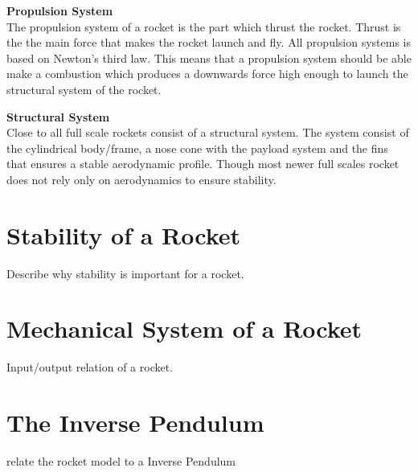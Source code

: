 \textbf{Propulsion System}\\
The propulsion system of a rocket is the part which thrust the rocket. Thrust is the the main force that makes the rocket launch and fly. All propulsion systems is based on Newton's third law. This means that a propulsion system should be able make a combustion which produces a downwards force high enough to launch the structural system of the rocket. 


\textbf{Structural System}\\
Close to all full scale rockets consist of a structural system. The system consist of the cylindrical body/frame, a nose cone with the payload system and the fins that ensures a stable aerodynamic profile. Though most newer full scales rocket does not rely only on aerodynamics to ensure stability.
   



\section{Stability of a Rocket}
Describe why stability is important for a rocket. 
\section{Mechanical System of a Rocket}
Input/output relation of a rocket.
\section{The Inverse Pendulum}
relate the rocket model to a Inverse Pendulum
